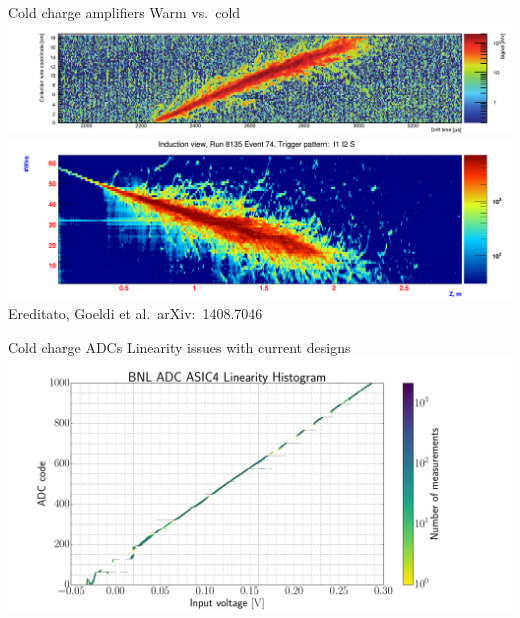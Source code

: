\documentclass[]{beamer}
\newcommand*{\emphcol}{blue}
\begin{document}
\begin{frame}{Cold charge amplifiers}{\color{\emphcol} Warm vs.\ cold}
	\centering
	\includegraphics[width=\textwidth]{defence/AT_warmPreamps}\\
	\includegraphics[width=\textwidth]{defence/AT_coldPreamps}\\
	{\tiny Ereditato, Goeldi et al.\ arXiv:~1408.7046~\cite{larasic}}\\
\end{frame}

\begin{frame}{Cold charge ADCs}{\color{\emphcol} Linearity issues with current designs}
	\centering
	\includegraphics[height=.8\textheight]{bnl/bnl_adc_lin}
\end{frame}
\end{document}
